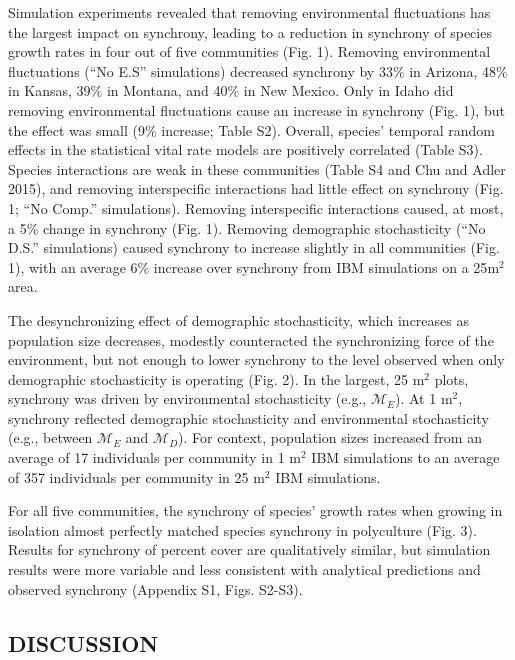 \documentclass[12pt,]{article}
\begin{document}
Simulation experiments revealed that removing environmental fluctuations
has the largest impact on synchrony, leading to a reduction in synchrony
of species growth rates in four out of five communities (Fig. 1).
Removing environmental fluctuations (``No E.S'' simulations) decreased
synchrony by 33\% in Arizona, 48\% in Kansas, 39\% in Montana, and 40\%
in New Mexico. Only in Idaho did removing environmental fluctuations
cause an increase in synchrony (Fig. 1), but the effect was small (9\%
increase; Table S2). Overall, species' temporal random effects in the
statistical vital rate models are positively correlated (Table S3).
Species interactions are weak in these communities (Table S4 and Chu and
Adler 2015), and removing interspecific interactions had little effect
on synchrony (Fig. 1; ``No Comp.'' simulations). Removing interspecific
interactions caused, at most, a 5\% change in synchrony (Fig. 1).
Removing demographic stochasticity (``No D.S.'' simulations) caused
synchrony to increase slightly in all communities (Fig. 1), with an
average 6\% increase over synchrony from IBM simulations on a
25\(\text{m}^2\) area.

The desynchronizing effect of demographic stochasticity, which increases
as population size decreases, modestly counteracted the synchronizing
force of the environment, but not enough to lower synchrony to the level
observed when only demographic stochasticity is operating (Fig. 2). In
the largest, 25 \(\text{m}^2\) plots, synchrony was driven by
environmental stochasticity (e.g., \(\mathcal{M}_E\)). At 1
\(\text{m}^2\), synchrony reflected demographic stochasticity and
environmental stochasticity (e.g., between \(\mathcal{M}_E\) and
\(\mathcal{M}_D\)). For context, population sizes increased from an
average of 17 individuals per community in 1 \(\text{m}^2\) IBM
simulations to an average of 357 individuals per community in 25
\(\text{m}^2\) IBM simulations.

For all five communities, the synchrony of species' growth rates when
growing in isolation almost perfectly matched species synchrony in
polyculture (Fig. 3). Results for synchrony of percent cover are
qualitatively similar, but simulation results were more variable and
less consistent with analytical predictions and observed synchrony
(Appendix S1, Figs. S2-S3).

\subsection{DISCUSSION}\label{discussion}
\end{document}
